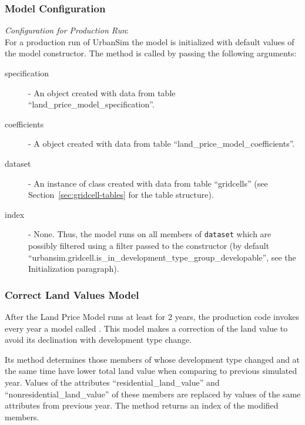 \subsubsection{Model Configuration}
\modelsindex
%
{\em Configuration for Production Run}:\\[1mm]
For a production run of UrbanSim the model \modelsindex is
initialized with default values of the model \modelsindex
constructor. The  method is called by passing the
following arguments:
\begin{description}
\item[specification] - An
 object created with data from table
``land_price_model_specification''.  \modelsindex
\item[coefficients] \coefficientsindex - A  \coefficientsindex object created
with data from table ``land_price_model_coefficients''. \coefficientsindex\modelsindex
\item[dataset] \datasetindex - An instance of class  created with data
  from table ``gridcells'' (see Section~\ref{sec:gridcell-tables} for the
  table structure).
\item[index] - None. Thus, the model \modelsindex runs on all members of \verb|dataset| \datasetindex which are possibly 
filtered using a filter passed to the constructor (by default ``urbansim.gridcell.is_in_development_type_group_developable'', see
the Initialization paragraph).
\end{description}

\subsubsection{Correct Land Values Model}
\modelsindex
%
After the Land Price Model \modelsindex runs at least for 2 years, the production code
invokes every year a model \modelsindex called . This model \modelsindex makes a
correction of the land value to avoid its declination with development type
change.

Its  method determines those members of  \datasetindex whose
development type changed and at the same time have lower total land value when
comparing to previous simulated year. Values of the attributes \attributesindex
``residential_land_value'' and ``nonresidential_land_value'' of these members
are replaced by values of the same attributes \attributesindex from previous year. The method
returns an index of the modified  \datasetindex members.

